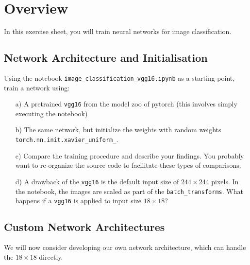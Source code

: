 \def\firstname{Tim}
\def\lastname{Dahmen}
\def\aufgabenblatt{5}


\newcommand{\vgg}{\texttt{vgg16} }



\thispagestyle{page1} 

\section{Overview}

In this exercise sheet, you will train neural networks for image classification. 

\subsection{Network Architecture and Initialisation}

Using the notebook \texttt{image\_classification\_vgg16.ipynb} as a starting point, train a network using:

\begin{enumerate}

\item[a)] A pretrained \vgg from the model zoo of pytorch (this involves simply executing the notebook)

\item[b)] The same network, but initialize the weights with random weights \texttt{torch.nn.init.xavier\_uniform\_}.

\item[c)] Compare the training procedure and describe your findings. You probably want to re-organize the source code to facilitate these types of comparisons.

\item[d)] A drawback of the \vgg is the default input size of $244 \times 244$ pixels. In the notebook, the images are scaled as part of the \texttt{batch\_transforms}. What happens if a \vgg is applied to input size $18\times18$?

\end{enumerate}

\subsection{Custom Network Architectures}

We will now consider developing our own network architecture, which can handle the $18\times18$ directly. 

